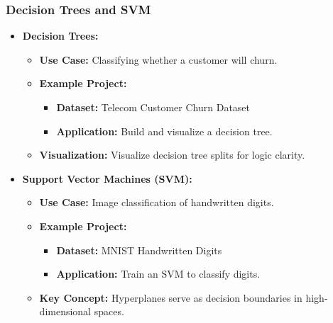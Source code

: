 \documentclass[aspectratio=169]{beamer}
\begin{document}
\begin{frame}[fragile]
    \frametitle{Decision Trees and SVM}
    \begin{itemize}
        \item \textbf{Decision Trees:}
        \begin{itemize}
            \item \textbf{Use Case:} Classifying whether a customer will churn.
            \item \textbf{Example Project:}
            \begin{itemize}
                \item \textbf{Dataset:} Telecom Customer Churn Dataset
                \item \textbf{Application:} Build and visualize a decision tree.
            \end{itemize}
            \item \textbf{Visualization:} Visualize decision tree splits for logic clarity.
        \end{itemize}
        
        \item \textbf{Support Vector Machines (SVM):}
        \begin{itemize}
            \item \textbf{Use Case:} Image classification of handwritten digits.
            \item \textbf{Example Project:}
            \begin{itemize}
                \item \textbf{Dataset:} MNIST Handwritten Digits
                \item \textbf{Application:} Train an SVM to classify digits.
            \end{itemize}
            \item \textbf{Key Concept:} Hyperplanes serve as decision boundaries in high-dimensional spaces.
        \end{itemize}
    \end{itemize}
\end{frame}
\end{document}
